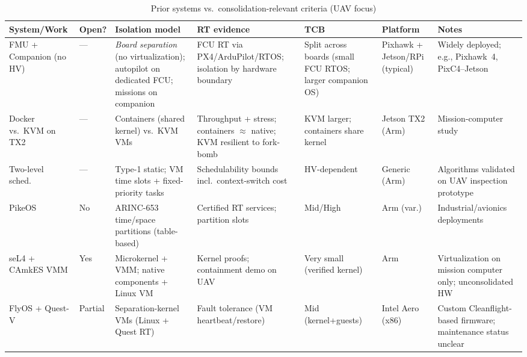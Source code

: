 \begin{table}[!tbp]
  \centering
  \caption{Prior systems vs.\ consolidation-relevant criteria (UAV focus)}
  \label{tab:rw-compare}
  \begingroup
  \setlength{\tabcolsep}{3.2pt}
  \renewcommand{\arraystretch}{1.10}
  \setlength{\extrarowheight}{0.4ex}
  \scriptsize
  \begin{tabularx}{\textwidth}{@{}%
    >{\raggedright\arraybackslash}p{1.8cm}  %
    >{\centering\arraybackslash}p{0.9cm}    %
    >{\raggedright\arraybackslash}p{3.0cm}  %
    >{\raggedright\arraybackslash}p{3.0cm}  %
    >{\raggedright\arraybackslash}p{2.1cm}  %
    >{\raggedright\arraybackslash}p{1.5cm}  %
    >{\raggedright\arraybackslash}X         %
    @{}}
    \toprule
    \textbf{System/Work} & \textbf{Open?} & \textbf{Isolation model} & \textbf{RT evidence} & \textbf{TCB} & \textbf{Platform} & \textbf{Notes} \\
    \midrule
    FMU + Companion (no HV) & — & \textit{Board separation} (no virtualization); autopilot on dedicated FCU; missions on companion & FCU RT via PX4/ArduPilot/RTOS; isolation by hardware boundary & Split across boards (small FCU RTOS; larger companion OS) & Pixhawk + Jetson/RPi (typical) & Widely deployed; e.g., Pixhawk~4, PixC4–Jetson \cite{pixhawk4,jetson-docs} \\
    \midrule
    Docker vs.\ KVM on TX2 \cite{wang_enabling_2018} & — & Containers (shared kernel) vs.\ KVM VMs & Throughput + stress; containers \(\approx\) native; KVM resilient to fork-bomb & KVM larger; containers share kernel & Jetson TX2 (Arm) & Mission-computer study \\
    Two-level sched.\ \cite{fautrel_hypervisor_2019} & — & Type-1 static; VM time slots + fixed-priority tasks & Schedulability bounds incl.\ context-switch cost & HV-dependent & Generic (Arm) & Algorithms validated on UAV inspection prototype \\
    PikeOS~\cite{pikeOS}  & No & ARINC-653 time/space partitions (table-based) & Certified RT services; partition slots & Mid/High & Arm (var.) & Industrial/avionics deployments \\
    seL4 + CAmkES VMM \cite{klein_formally_2018} & Yes & Microkernel + VMM; native components + Linux VM & Kernel proofs; containment demo on UAV & Very small (verified kernel) & Arm & Virtualization on mission computer only; unconsolidated HW \\
    FlyOS + Quest-V~\cite{farrukh_flyos_2023} & Partial & Separation-kernel VMs (Linux + Quest RT) & Fault tolerance (VM heartbeat/restore) & Mid (kernel+guests) & Intel Aero (x86) & Custom Cleanflight-based firmware; maintenance status unclear \\

\end{tabularx}
\end{table}
